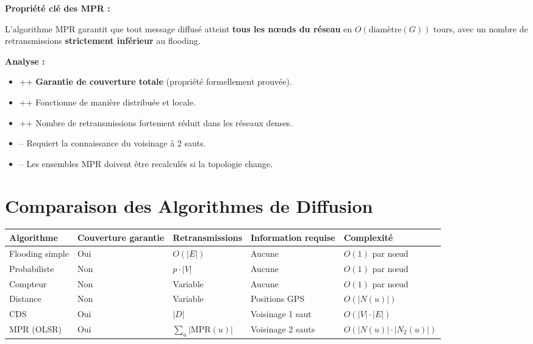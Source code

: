 \documentclass[12pt,a4paper]{article}
\begin{document}
\begin{important}
\textbf{Propriété clé des MPR :}

L'algorithme MPR garantit que tout message diffusé atteint \textbf{tous les nœuds du réseau}
en $O(\text{diamètre}(G))$ tours, avec un nombre de retransmissions \textbf{strictement
inférieur} au flooding.

\textbf{Analyse :}
\begin{itemize}
    \item \textcolor{defvert}{++} \textbf{Garantie de couverture totale} (propriété formellement
          prouvée).
    \item \textcolor{defvert}{++} Fonctionne de manière distribuée et locale.
    \item \textcolor{defvert}{++} Nombre de retransmissions fortement réduit dans les réseaux
          denses.
    \item \textcolor{importantrouge}{--} Requiert la connaissance du voisinage à 2 sauts.
    \item \textcolor{importantrouge}{--} Les ensembles MPR doivent être recalculés si la
          topologie change.
\end{itemize}
\end{important}

\newpage

\section{Comparaison des Algorithmes de Diffusion}

\begin{center}
\begin{tabular}{|p{3cm}|p{2.5cm}|p{2.5cm}|p{3cm}|p{2.5cm}|}
\hline
\textbf{Algorithme} & \textbf{Couverture garantie} & \textbf{Retransmissions} & \textbf{Information requise} & \textbf{Complexité} \\
\hline
Flooding simple & \textcolor{defvert}{Oui} & $O(|E|)$ & Aucune & $O(1)$ par nœud \\
\hline
Probabiliste & \textcolor{importantrouge}{Non} & $p \cdot |V|$ & Aucune & $O(1)$ par nœud \\
\hline
Compteur & \textcolor{importantrouge}{Non} & Variable & Aucune & $O(1)$ par nœud \\
\hline
Distance & \textcolor{importantrouge}{Non} & Variable & Positions GPS & $O(|N(u)|)$ \\
\hline
CDS & \textcolor{defvert}{Oui} & $|D|$ & Voisinage 1 saut & $O(|V| \cdot |E|)$ \\
\hline
MPR (OLSR) & \textcolor{defvert}{Oui} & $\sum_u |\text{MPR}(u)|$ & Voisinage 2 sauts & $O(|N(u)| \cdot |N_2(u)|)$ \\
\hline
\end{tabular}
\end{center}
\end{document}

